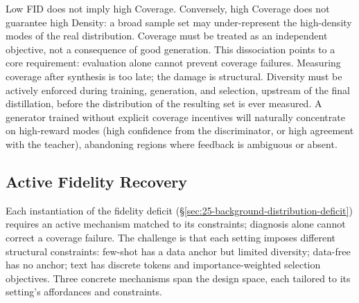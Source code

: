 \documentclass[12pt, a4paper, twoside]{book}
\numberwithin{equation}{chapter}
\theoremstyle{plain}
\theoremstyle{definition}
\theoremstyle{remark}
\newenvironment{foldable}{}{}
\begin{document}
\begin{foldable}
  Low \ac{FID} does not imply high Coverage.
  Conversely, high Coverage does not guarantee high Density: a broad sample set may under-represent the high-density modes of the real distribution.
  Coverage must be treated as an independent objective, not a consequence of good generation.
  This dissociation points to a core requirement: evaluation alone cannot prevent coverage failures.
  Measuring coverage after synthesis is too late; the damage is structural.
  Diversity must be actively enforced during training, generation, and selection, upstream of the final distillation, before the distribution of the resulting set is ever measured.
  A generator trained without explicit coverage incentives will naturally concentrate on high-reward modes (high confidence from the discriminator, or high agreement with the teacher), abandoning regions where feedback is ambiguous or absent.
\end{foldable}

\subsection{Active Fidelity Recovery} \label{sec:25-background-distribution-remedy}
\begin{foldable}
  Each instantiation of the fidelity deficit (\S\ref{sec:25-background-distribution-deficit}) requires an active mechanism matched to its constraints; diagnosis alone cannot correct a coverage failure.
  The challenge is that each setting imposes different structural constraints: few-shot has a data anchor but limited diversity; data-free has no anchor; text has discrete tokens and importance-weighted selection objectives.
  Three concrete mechanisms span the design space, each tailored to its setting's affordances and constraints.
\end{foldable}
\end{document}
